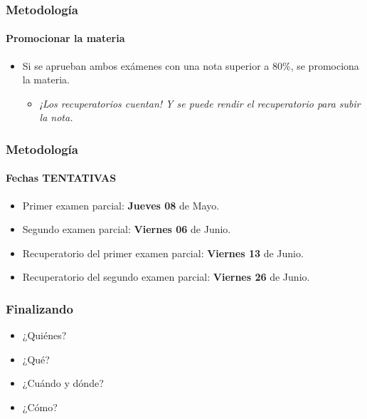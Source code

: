\documentclass[11pt,a4paper,spanish]{beamer}
\begin{document}
\begin{frame}

    \frametitle{Metodología}
    \framesubtitle{Promocionar la materia}

\begin{itemize}

    \item Si se aprueban ambos exámenes con una nota superior a $80\%$, se
        promociona la materia.
        \begin{itemize}
            \item \emph{¡Los recuperatorios cuentan! Y se puede rendir
                el recuperatorio para subir la nota.}
        \end{itemize}

\end{itemize}

\end{frame}

\begin{frame}

    \frametitle{Metodología}
    \framesubtitle{Fechas TENTATIVAS}

\begin{itemize}

    \item Primer examen parcial: \textbf{Jueves 08} de Mayo.
    \item Segundo examen parcial: \textbf{Viernes 06} de Junio.
    \item Recuperatorio del primer examen parcial: \textbf{Viernes 13} de
        Junio.
    \item Recuperatorio del segundo examen parcial: \textbf{Viernes 26} de
        Junio.

\end{itemize}

\end{frame}

\begin{frame}

    \frametitle{Finalizando}

\begin{itemize}

\item ¿Quiénes?

\item ¿Qué?

\item ¿Cuándo y dónde?

\item ¿Cómo?

\end{itemize}

\end{frame}
\end{document}
